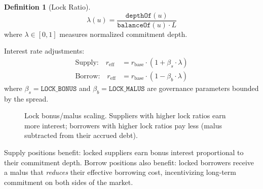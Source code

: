 \documentclass[10pt,a4paper,twocolumn]{article}
\theoremstyle{definition}
\newtheorem{definition}{Definition}[section]
\theoremstyle{plain}
\theoremstyle{remark}
\begin{document}
\begin{definition}[Lock Ratio]
\label{def:lock-ratio}
\[
\lambda(u) = \frac{\texttt{depthOf}(u)}{\texttt{balanceOf}(u) \cdot L}
\]
where $\lambda \in [0,1]$ measures normalized commitment depth.
\end{definition}

Interest rate adjustments:
\begin{align}
\text{Supply:} \quad r_{\text{eff}} &= r_{\text{base}} \cdot (1 + \beta_s \cdot \lambda) \label{eq:supply-bonus} \\
\text{Borrow:} \quad r_{\text{eff}} &= r_{\text{base}} \cdot (1 - \beta_b \cdot \lambda) \label{eq:borrow-malus}
\end{align}
where $\beta_s = \texttt{LOCK\_BONUS}$ and $\beta_b = \texttt{LOCK\_MALUS}$ are governance parameters bounded by the spread.

\begin{figure}[htbp]
\centering
{}
\caption{Lock bonus/malus scaling. Suppliers with higher lock ratios earn more interest; borrowers with higher lock ratios pay less (malus subtracted from their accrued debt).}
\label{fig:lock-bonus}
\end{figure}

Supply positions benefit: locked suppliers earn bonus interest proportional to their commitment depth. Borrow positions also benefit: locked borrowers receive a malus that \emph{reduces} their effective borrowing cost, incentivizing long-term commitment on both sides of the market.
\end{document}
